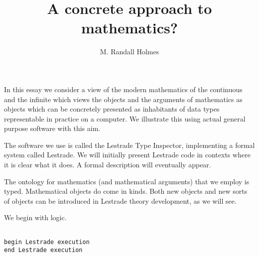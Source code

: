 \documentclass[12pt]{article}
\title{A concrete approach to mathematics?}
\author{M. Randall Holmes}
\begin{document}
\maketitle

In this essay we consider a view of the modern mathematics of the continuous and the infinite which views the objects and the arguments of mathematics as objects which can be concretely presented as inhabitants of data types representable in practice on a computer.   We illustrate this using actual general purpose software with this aim.

The software we use is called the Lestrade Type Inspector, implementing a formal system called Lestrade.  We will initially present Lestrade code in contexts where it is clear what it does.  A formal description will eventually appear.

The ontology for mathematics (and mathematical arguments) that we employ is typed.  Mathematical objects do come in kinds.  Both new objects and new sorts of objects can be introduced in Lestrade theory development, as we will see.

We begin with logic.

\begin{verbatim}

begin Lestrade execution
end Lestrade execution

\end{verbatim}

\begin{verbatim}


\end{verbatim}
\end{document}
